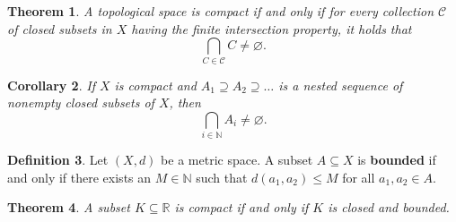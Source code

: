 \documentclass[ 12pt ]{article}
\newcounter{lecture_num}
\theoremstyle{plain}
\theoremstyle{plain}
\newtheorem{theorem}{Theorem}[lecture_num]
\newtheorem{corollary}[theorem]{Corollary}
\theoremstyle{definition}
\newtheorem{definition}[theorem]{Definition}
\theoremstyle{remark}
\begin{document}
\begin{theorem}
	A topological space is compact if and only if for every collection $\mathcal{C}$ of closed subsets in $X$ having the finite intersection property, it holds that $$\bigcap_{C \in
	\mathcal{C}} C \neq \varnothing.$$
\end{theorem}

\begin{corollary}
	If $X$ is compact and $A_1 \supseteq A_2 \supseteq \hdots$ is a nested sequence of nonempty closed subsets of $X$, then $$\bigcap_{i \in \mathbb{N}} A_i \neq \varnothing.$$
\end{corollary}

\begin{definition}
	Let $(X, d)$ be a metric space. A subset $A \subseteq X$ is \textbf{bounded} if and only if there exists an $M \in \mathbb{N}$ such that $d(a_1, a_2) \leq M$ for all $a_1, a_2 \in A$.
\end{definition}

\begin{theorem}
	A subset $K \subseteq \mathbb{R}$ is compact if and only if $K$ is closed and bounded.
\end{theorem}
\end{document}
